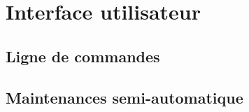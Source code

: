 
\chapter{Interface utilisateur}

\section{Ligne de commandes}

\section{Maintenances semi-automatique}

